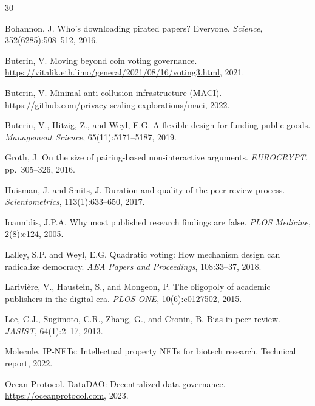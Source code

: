 \documentclass[11pt,letterpaper]{article}
\begin{document}
\begin{thebibliography}{30}

Bohannon, J.
\newblock Who's downloading pirated papers? Everyone.
\newblock \emph{Science}, 352(6285):508--512, 2016.

Buterin, V.
\newblock Moving beyond coin voting governance.
\newblock \url{https://vitalik.eth.limo/general/2021/08/16/voting3.html}, 2021.

Buterin, V.
\newblock Minimal anti-collusion infrastructure (MACI).
\newblock \url{https://github.com/privacy-scaling-explorations/maci}, 2022.

Buterin, V., Hitzig, Z., and Weyl, E.G.
\newblock A flexible design for funding public goods.
\newblock \emph{Management Science}, 65(11):5171--5187, 2019.

Groth, J.
\newblock On the size of pairing-based non-interactive arguments.
\newblock \emph{EUROCRYPT}, pp.~305--326, 2016.

Huisman, J. and Smits, J.
\newblock Duration and quality of the peer review process.
\newblock \emph{Scientometrics}, 113(1):633--650, 2017.

Ioannidis, J.P.A.
\newblock Why most published research findings are false.
\newblock \emph{PLOS Medicine}, 2(8):e124, 2005.

Lalley, S.P. and Weyl, E.G.
\newblock Quadratic voting: How mechanism design can radicalize democracy.
\newblock \emph{AEA Papers and Proceedings}, 108:33--37, 2018.

Larivi{\`e}re, V., Haustein, S., and Mongeon, P.
\newblock The oligopoly of academic publishers in the digital era.
\newblock \emph{PLOS ONE}, 10(6):e0127502, 2015.

Lee, C.J., Sugimoto, C.R., Zhang, G., and Cronin, B.
\newblock Bias in peer review.
\newblock \emph{JASIST}, 64(1):2--17, 2013.

Molecule.
\newblock IP-NFTs: Intellectual property NFTs for biotech research.
\newblock Technical report, 2022.

Ocean Protocol.
\newblock DataDAO: Decentralized data governance.
\newblock \url{https://oceanprotocol.com}, 2023.


\end{thebibliography}
\end{document}
